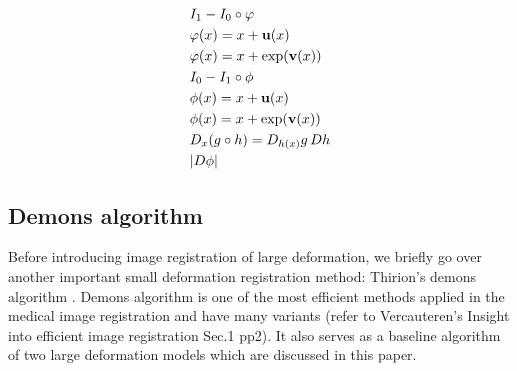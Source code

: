 \documentclass[letterpaper,12pt]{article}
\begin{document}
\begin{align}
& I_1 - I_0 \circ \varphi \\
& \varphi(x) = x + \mathbf{u}(x) \\
& \varphi(x) = x + \exp(\mathbf{v}(x)) \\
& I_0 - I_1 \circ \phi \\
& \phi(x) = x + \mathbf{u}(x) \\
& \phi(x) = x + \exp(\mathbf{v}(x)) \\
& D_{x} (g \circ h)  = D_{h(x)} g  \, D h \\ 
& |D \phi |   \\
\end{align}


\subsection{Demons algorithm}
\label{sec:demons}

Before introducing image registration of large deformation, we briefly go over another important small deformation registration method: Thirion's demons algorithm \cite{Thirion98}. Demons algorithm is one of the most efficient methods applied in the medical image registration and have many variants (refer to Vercauteren's Insight into efficient image registration Sec.1 pp2). It also serves as a baseline algorithm of two large deformation models which are discussed in this paper. 
\end{document}
